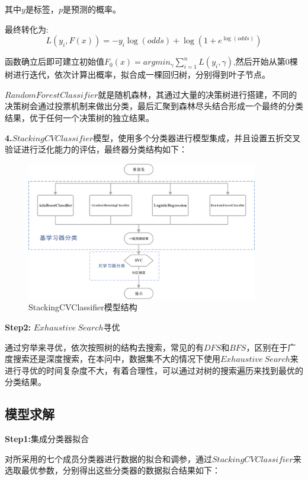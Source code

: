 \documentclass[UTF8]{ctexart}
\begin{document}
其中$y$是标签，$p$是预测的概率。

最终转化为:
\begin{equation}
    L(y_i,F(x)) = -y_i \log (odds)+\log (1+e^{\log (odds)})
\end{equation}


函数确立后即可建立初始值$F_0(x) = argmin_\gamma \sum _{i=1}^n L(y_i,\gamma)$,然后开始从第0棵树进行迭代，依次计算出概率，拟合成一棵回归树，分别得到叶子节点。

$RandomForestClassifier$就是随机森林，其通过大量的决策树进行搭建，不同的决策树会通过投票机制来做出分类，最后汇聚到森林尽头结合形成一个最终的分类结果，优于任何一个决策树的独立结果。

\textbf{4.}$StackingCVClassifier$模型，使用多个分类器进行模型集成，并且设置五折交叉验证进行泛化能力的评估，最终器分类结构如下：

\begin{figure}[H]\centering
    \includegraphics[width=0.9\textwidth]{img/器分类结构.png} %
    \caption{StackingCVClassifier模型结构} %
    \label{fig:figure 9} %
\end{figure}

\textbf{Step2:} $Exhaustive\ Search$寻优

通过穷举来寻优，依次按照树的结构去搜索，常见的有$DFS$和$BFS$，区别在于广度搜索还是深度搜索，在本问中，数据集不大的情况下使用$Exhaustive\ Search$来进行寻优的时间复杂度不大，有着合理性，可以通过对树的搜索遍历来找到最优的分类结果。


\subsection{模型求解}

\textbf{Step1:}集成分类器拟合

对所采用的七个成员分类器进行数据的拟合和调参，通过$StackingCVClassifier$来选取最优参数，分别得出这些分类器的数据拟合结果如下：
\end{document}
